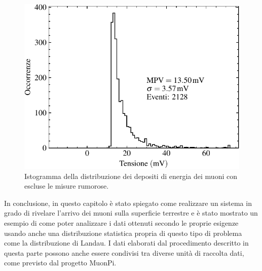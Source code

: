 \begin{figure}[h!]
    \centering
    \includegraphics[width=.85\linewidth]{img/istogramma_minimi_selezionati.pdf}
    \caption{Istogramma della distribuzione dei depositi di energia dei muoni con escluse le misure rumorose.}
    \label{fig:istogramma_minimi_selezionati}
\end{figure}

In conclusione, in questo capitolo è stato spiegato come realizzare un sistema in grado di rivelare l'arrivo dei muoni sulla superficie
terrestre e è stato mostrato un esempio di come poter analizzare i dati ottenuti secondo le proprie esigenze usando anche una distribuzione
statistica propria di questo tipo di problema come la distribuzione di Landau. I dati elaborati dal procedimento
descritto in questa parte possono anche essere condivisi tra diverse unità di raccolta dati, come previsto dal progetto MuonPi.
